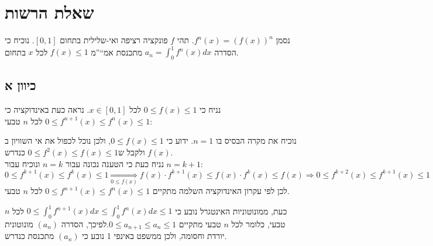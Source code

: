 \documentclass[11pt, oneside]{article}
\newcommand{\logr}[1]{\underset{\text{#1}}{\Longrightarrow}}
\newcommand{\defi}[3]{\int_{#1}^{#2} #3}
\begin{document}
\clearpage
\section*{שאלת הרשות}
נסמן $f^{n}(x) = (f(x))^{n}$. תהי $f$ פונקציה רציפה ואי-שלילית בתחום $[0, 1]$. נוכיח כי הסדרה $a_{n} = \defi{0}{1}{f^{n}(x)dx}$ מתכנסת אמ``''מ $f(x) \le 1$ לכל $x$ בתחום.
\subsection*{כיוון א}
נניח כי $0 \le f(x) \le 1$ לכל $x \in [0, 1]$. נראה כעת באינדוקציה כי $0 \le f^{n + 1}(x) \le f^{n}(x) \le 1$ לכל $n$ טבעי:

נוכיח את מקרה הבסיס בו $n = 1$. ידוע כי $0 \le f(x) \le 1$, ולכן נוכל לכפול את אי השוויון ב$f(x)$ ולקבל ש$0 \le f^{2}(x) \le f(x) \le 1$ כנדרש.\\
נניח כעת כי הטענה נכונה עבור $n = k$ ונוכיח עבור $n = k + 1$:
\[
0 \le f^{k + 1}(x) \le f^{k}(x) \le 1 \logr{$0 \le f(x)$} f(x) \cdot f^{k + 1}(x) \le f(x) \cdot f^{k}(x) \le f(x) \logr{} 0 \le f^{k + 2}(x) \le f^{k + 1}(x) \le 1
\]
לכן לפי עקרון האינדוקציה השלמה מתקיים $0 \le f^{n + 1}(x) \le f^{n}(x) \le 1$ לכל $n$ טבעי.

כעת, ממונוטוניות האינטגרל נובע כי $0 \le \defi{0}{1}{f^{n + 1}(x)dx} \le \defi{0}{1}{f^{n}(x)dx} \le 1$ לכל $n$ טבעי, כלומר לכל $n$ טבעי מתקיים $0 \le a_{n + 1} \le a_{n} \le 1$.לפיכך, הסדרה $(a_{n})$ מונוטונית יורדת וחסומה, ולכן ממשפט באינפי 1 נובע כי $(a_{n})$ מתכנסת כנדרש.
\end{document}
